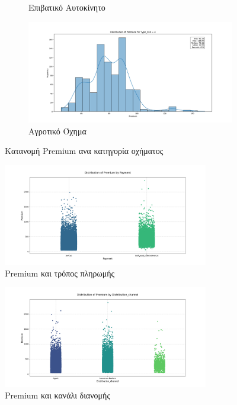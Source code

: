 \documentclass{llncs}
\begin{document}
\begin{figure}[h!]
\begin{subfigure}{0.45\linewidth}
       \caption{Επιβατικό Αυτοκίνητο}
       \label{fig:subfig3}
        \end{subfigure}
         \begin{subfigure}{0.45\linewidth}
        \includegraphics[width=\linewidth]{images/premium_risk4.png}
        \caption{Αγροτικό Όχημα}
        \label{fig:subfig4}
         \end{subfigure}
  \caption{Κατανομή Premium ανα κατηγορία οχήματος}
  \label{fig:subfigures4}
\end{figure}

\begin{figure}[h!]
    \begin{center}
        \includegraphics[width=0.8\textwidth]{images/PaymentAll.png}
    \end{center}
    \caption{Premium και τρόπος πληρωμής} 
    \label{fig:premium_payment}   
\end{figure}

\begin{figure}[h!]
    \begin{center}
        \includegraphics[width=0.8\textwidth]{images/distributionAll.png}
    \end{center}
    \caption{Premium και κανάλι διανομής} 
    \label{fig:premium_distribution_channel}   
\end{figure}
\end{document}
